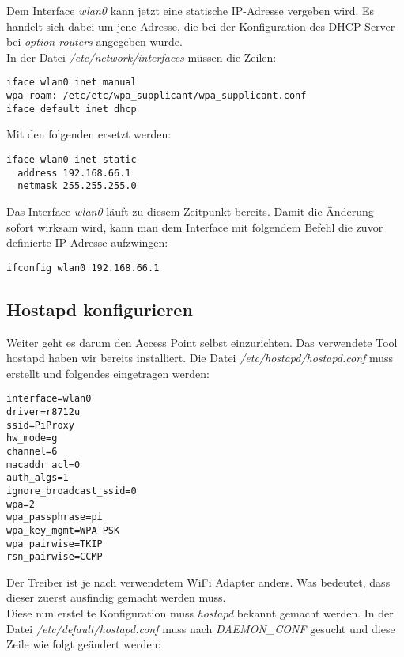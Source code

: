 Dem Interface \textit{wlan0} kann jetzt eine statische IP-Adresse vergeben wird. Es handelt sich dabei um jene Adresse, die bei der Konfiguration des DHCP-Server bei \textit{option routers} angegeben wurde. \\
In der Datei \textit{/etc/network/interfaces} müssen die Zeilen:

\begin{lstlisting}
iface wlan0 inet manual
wpa-roam: /etc/etc/wpa_supplicant/wpa_supplicant.conf
iface default inet dhcp
\end{lstlisting}

Mit den folgenden ersetzt werden:

\begin{lstlisting}
iface wlan0 inet static
  address 192.168.66.1
  netmask 255.255.255.0
\end{lstlisting}

Das Interface \textit{wlan0} läuft zu diesem Zeitpunkt bereits. Damit die Änderung sofort wirksam wird, kann man dem Interface mit folgendem Befehl die zuvor definierte IP-Adresse aufzwingen:

\begin{lstlisting}
ifconfig wlan0 192.168.66.1
\end{lstlisting}


\subsection{Hostapd konfigurieren}
Weiter geht es darum den Access Point selbst einzurichten. Das verwendete Tool hostapd haben wir bereits installiert.
Die Datei \textit{/etc/hostapd/hostapd.conf} muss erstellt und folgendes eingetragen werden:

\begin{lstlisting}
interface=wlan0
driver=r8712u
ssid=PiProxy
hw_mode=g
channel=6
macaddr_acl=0
auth_algs=1
ignore_broadcast_ssid=0
wpa=2
wpa_passphrase=pi
wpa_key_mgmt=WPA-PSK
wpa_pairwise=TKIP
rsn_pairwise=CCMP
\end{lstlisting}

Der Treiber ist je nach verwendetem WiFi Adapter anders. Was bedeutet, dass dieser zuerst ausfindig gemacht werden muss. \\

Diese nun erstellte Konfiguration muss \textit{hostapd} bekannt gemacht werden. In der Datei \textit{/etc/default/hostapd.conf} muss nach \textit{DAEMON\_CONF} gesucht und diese Zeile wie folgt geändert werden:


